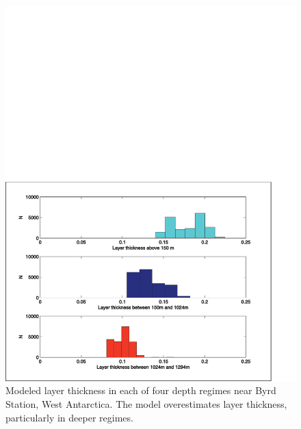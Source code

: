 \documentclass[12pt]{article}
\begin{document}
\begin{figure}[ht]
\begin{center}
\includegraphics[scale=0.75]{figures/layerthk_v3_10ksamples}
\caption{Modeled layer thickness in each of four depth regimes near Byrd Station, West Antarctica. The model overestimates layer thickness, particularly in deeper regimes. }
\label{fig:accum}
\end{center}
\end{figure}
\end{document}
